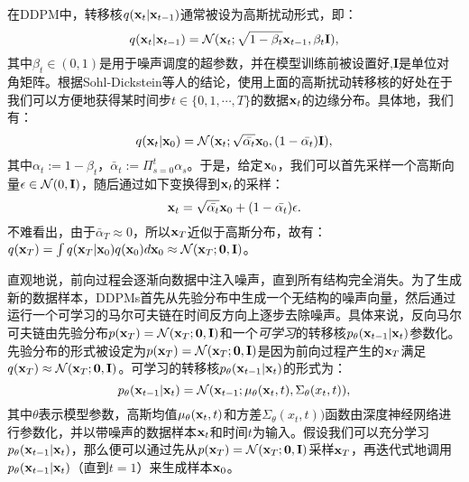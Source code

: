 \documentclass[11pt,a4paper,UTF8]{ctexart}
\begin{document}
在DDPM中，转移核$q(\mathbf{x}_t|\mathbf{x}_{t-1})$通常被设为高斯扰动形式，即：
\begin{equation}
    q(\mathbf{x}_t|\mathbf{x}_{t-1}) =\mathcal{N}(\mathbf{x}_t;\sqrt{1-\beta_t}\mathbf{x}_{t-1},\beta_t\mathbf{I}),
\label{ddpm:forward_process}
\end{equation}
其中$\beta_t\in(0,1)$是用于噪声调度的超参数，并在模型训练前被设置好,$\mathbf{I}$是单位对角矩阵。根据Sohl-Dickstein等人\cite{sohldickstein2015diffusion}的结论，使用上面的高斯扰动转移核的好处在于我们可以方便地获得某时间步$t\in\{0,1,\cdots,T\}$的数据$\mathbf{x}_t$的边缘分布。具体地，我们有：
\begin{equation*}
    q(\mathbf{x}_t|\mathbf{x}_0)=\mathcal{N}(\mathbf{x}_t;\sqrt{\bar{\alpha_t}}\mathbf{x}_0,(1-\bar{\alpha_t})\mathbf{I}),
\end{equation*}
其中$\alpha_t:=1-\beta_t$，$\bar{\alpha}_t:=\Pi_{s=0}^t\alpha_s$。于是，给定$\mathbf{x}_0$，我们可以首先采样一个高斯向量$\epsilon\in\mathcal{N}(0,\mathbf{I})$，随后通过如下变换得到$\mathbf{x}_t$的采样：
\begin{equation*}
    \mathbf{x}_t=\sqrt{\bar{\alpha_t}}\mathbf{x}_0 + (1-\bar{\alpha_t})\epsilon.
\end{equation*}
不难看出，由于$\bar{\alpha}_T\approx 0$，所以$\mathbf{x}_T$近似于高斯分布，故有：$q(\mathbf{x}_T)=\int q(\mathbf{x}_T|\mathbf{x}_0)q(\mathbf{x}_0)d\mathbf{x}_0\approx \mathcal{N}(\mathbf{x}_T;\mathbf{0},\mathbf{I})$。

直观地说，前向过程会逐渐向数据中注入噪声，直到所有结构完全消失。为了生成新的数据样本，DDPMs首先从先验分布中生成一个无结构的噪声向量，然后通过运行一个可学习的马尔可夫链在时间反方向上逐步去除噪声。具体来说，反向马尔可夫链由先验分布$p(\mathbf{x}_T)=\mathcal{N}(\mathbf{x}_T;\mathbf{0},\mathbf{I})$和一个\emph{可学习}的转移核$p_{\theta}(\mathbf{x}_{t-1}|\mathbf{x}_t)$参数化。先验分布的形式被设定为$p(\mathbf{x}_T)=\mathcal{N}(\mathbf{x}_T;\mathbf{0},\mathbf{I})$是因为前向过程产生的$\mathbf{x}_T$满足$q(\mathbf{x}_T)\approx \mathcal{N}(\mathbf{x}_T;\mathbf{0},\mathbf{I})$。可学习的转移核$p_{\theta}(\mathbf{x}_{t-1}|\mathbf{x}_t)$的形式为：
\begin{equation*}
    p_{\theta}(\mathbf{x}_{t-1}|\mathbf{x}_t) = \mathcal{N}(\mathbf{x}_{t-1};\mu_{\theta}(\mathbf{x}_t,t),\Sigma_{\theta}(x_t,t)),
\end{equation*}
其中$\theta$表示模型参数，高斯均值$\mu_{\theta}(\mathbf{x}_t,t)$和方差$\Sigma_{\theta}(x_t,t))$函数由深度神经网络进行参数化，并以带噪声的数据样本$\mathbf{x}_t$和时间$t$为输入。假设我们可以充分学习$p_{\theta}(\mathbf{x}_{t-1}|\mathbf{x}_t)$，那么便可以通过先从$p(\mathbf{x}_T)=\mathcal{N}(\mathbf{x}_T;\mathbf{0},\mathbf{I})$采样$\mathbf{x}_T$，再迭代式地调用$p_{\theta}(\mathbf{x}_{t-1}|\mathbf{x}_t)$（直到$t=1$）来生成样本$\mathbf{x}_0$。
\end{document}
